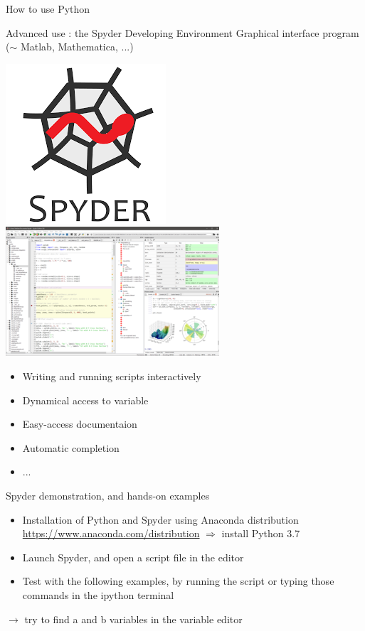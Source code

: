 \documentclass[11pt,unknownkeysallowed,usenames,dvipsnames]{beamer}
\begin{document}
\begin{frame}{How to use Python}
	\vspace*{5pt}
    \begin{block}{Advanced use : the Spyder Developing Environment}
	Graphical interface program ($\sim$ Matlab, Mathematica, ...)
	\vspace*{-10pt}
	\begin{center}
		\includegraphics[width=0.24\linewidth]{spyder-logo}%
	\includegraphics[width=0.4\linewidth]{spyder-screensho}
	\end{center}
	\vspace*{-10pt}
	\begin{itemize}
		\item Writing and running scripts interactively
		\item Dynamical access to variable
		\item Easy-access documentaion
		\item Automatic completion
		\item ...
	\end{itemize}
\end{block}
\end{frame}

\begin{frame}{Spyder demonstration, and hands-on examples}
\begin{itemize}
	\item Installation of Python and Spyder using Anaconda distribution\\
	\href{https://www.anaconda.com/distribution}{https://www.anaconda.com/distribution} $\Rightarrow$ install Python 3.7
	\item Launch Spyder, and open a script file in the editor
	\item Test with the following examples, by running the script or typing those commands in the ipython terminal
\end{itemize}
\pythonCode
$\rightarrow$ try to find a and b variables in the variable editor
\end{frame}
\end{document}
